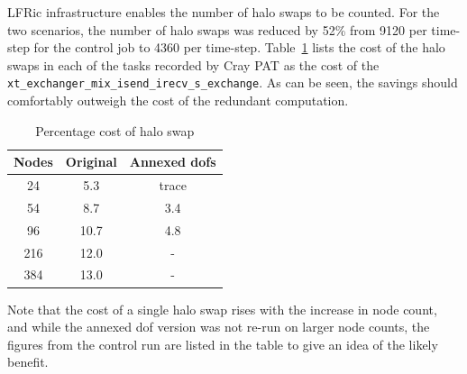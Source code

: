 LFRic infrastructure enables the number of halo swaps to be
counted. For the two scenarios, the number of halo swaps was reduced
by 52\% from 9120 per time-step for the control job to 4360 per
time-step.  Table~\ref{tab:annex} lists the cost of the halo swaps in
each of the tasks recorded by Cray PAT as the cost of the
\verb+xt_exchanger_mix_isend_irecv_s_exchange+. As can be seen, the
savings should comfortably outweigh the cost of the redundant
computation.


\begin{table}[ht!]
\scriptsize
  \begin{center}
    \caption{Percentage cost of halo swap}
    \label{tab:annex}
     \begin{tabular}{|c|c|c|}
      \textbf{Nodes} & \textbf{Original} & \textbf{Annexed dofs} \\
      \hline
      24 & 5.3  & trace  \\ 
      54 & 8.7  & 3.4    \\ 
      96 & 10.7 & 4.8    \\ 
      216 & 12.0 & -    \\ 
      384 & 13.0 & -    \\ 
    \end{tabular}
  \end{center}
\end{table}

Note that the cost of a single halo swap rises with the increase in
node count, and while the annexed dof version was not re-run on larger
node counts, the figures from the control run are listed in the table
to give an idea of the likely benefit. 





